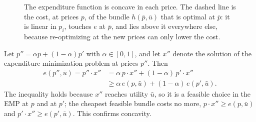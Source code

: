 \documentclass[11pt]{article}
\begin{document}
\begin{figure}[ht]
\centering
{}
\caption{The expenditure function is concave in each price. The dashed line is the
cost, at prices $p$, of the bundle $h(\bar p,\bar u)$ that is optimal at $\bar p$:
it is linear in $p_i$, touches $e$ at $\bar p$, and lies above it everywhere else,
because re-optimizing at the new prices can only lower the cost.}
\end{figure}

Let $p''=\alpha p+(1-\alpha)p'$ with $\alpha\in[0,1]$, and let $x''$ denote the
solution of the expenditure minimization problem at prices $p''$. Then
\[
\begin{aligned}
  e(p'',\bar u)=p''\cdot x''
  &=\alpha\,p\cdot x''+(1-\alpha)\,p'\cdot x''\\
  &\ge\alpha\,e(p,\bar u)+(1-\alpha)\,e(p',\bar u).
\end{aligned}
\]
The inequality holds because $x''$ reaches utility $\bar u$, so it is a feasible
choice in the EMP at $p$ and at $p'$; the cheapest feasible bundle costs no more,
$p\cdot x''\ge e(p,\bar u)$ and $p'\cdot x''\ge e(p',\bar u)$. This confirms
concavity.
\end{document}
